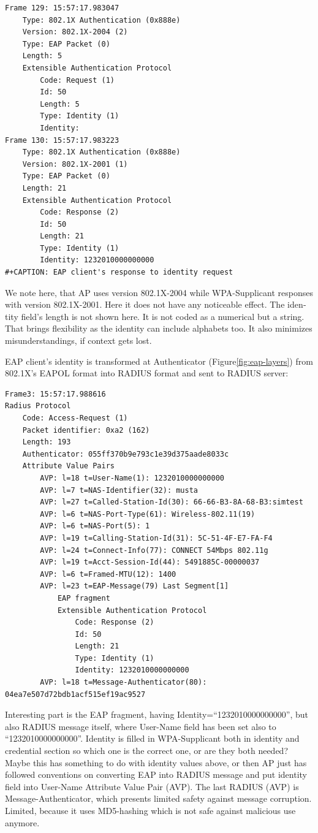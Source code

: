 \documentclass[12pt,a4paper,english]{tutthesis}
\begin{document}
\begin{otherlanguage}{english}
\begin{verbatim}
Frame 129: 15:57:17.983047
    Type: 802.1X Authentication (0x888e)
    Version: 802.1X-2004 (2)
    Type: EAP Packet (0)
    Length: 5
    Extensible Authentication Protocol
        Code: Request (1)
        Id: 50
        Length: 5
        Type: Identity (1)
        Identity: 
Frame 130: 15:57:17.983223
    Type: 802.1X Authentication (0x888e)
    Version: 802.1X-2001 (1)
    Type: EAP Packet (0)
    Length: 21
    Extensible Authentication Protocol
        Code: Response (2)
        Id: 50
        Length: 21
        Type: Identity (1)
        Identity: 1232010000000000
#+CAPTION: EAP client's response to identity request
\end{verbatim}
We note here, that AP uses version 802.1X-2004 while WPA-Supplicant responses with
version 802.1X-2001. Here it does not have any noticeable effect.
The identity field's length is not shown here.
It is not coded as a numerical but a string.
That brings flexibility as the identity can include alphabets too. It also minimizes misunderstandings,
if context gets lost.





EAP client's identity is transformed at Authenticator (Figure\ref{fig:eap-layers}) from 802.1X's 
EAPOL format  into RADIUS format and
sent to RADIUS server:
\begin{verbatim}
Frame3: 15:57:17.988616
Radius Protocol
    Code: Access-Request (1)
    Packet identifier: 0xa2 (162)
    Length: 193
    Authenticator: 055ff370b9e793c1e39d375aade8033c
    Attribute Value Pairs
        AVP: l=18 t=User-Name(1): 1232010000000000
        AVP: l=7 t=NAS-Identifier(32): musta
        AVP: l=27 t=Called-Station-Id(30): 66-66-B3-8A-68-B3:simtest
        AVP: l=6 t=NAS-Port-Type(61): Wireless-802.11(19)
        AVP: l=6 t=NAS-Port(5): 1
        AVP: l=19 t=Calling-Station-Id(31): 5C-51-4F-E7-FA-F4
        AVP: l=24 t=Connect-Info(77): CONNECT 54Mbps 802.11g
        AVP: l=19 t=Acct-Session-Id(44): 5491885C-00000037
        AVP: l=6 t=Framed-MTU(12): 1400
        AVP: l=23 t=EAP-Message(79) Last Segment[1]
            EAP fragment
            Extensible Authentication Protocol
                Code: Response (2)
                Id: 50
                Length: 21
                Type: Identity (1)
                Identity: 1232010000000000
        AVP: l=18 t=Message-Authenticator(80): 04ea7e507d72bdb1acf515ef19ac9527
\end{verbatim}
Interesting part is the EAP fragment, having
Identity=``1232010000000000'', but
also RADIUS message itself, where User-Name field has been set also 
to ``1232010000000000''. 
Identity is filled in WPA-Supplicant both in identity and credential
section so which one is the correct one, or are they both needed?
Maybe this has something to do with identity
values above, or then AP just has followed conventions on converting
EAP into RADIUS message and put identity field into User-Name Attribute Value Pair (AVP).
The last RADIUS (AVP) is 
Message-Authenticator, which presents limited safety against message 
corruption. Limited, because it uses MD5-hashing which is not safe
against malicious use anymore.


\end{otherlanguage}
\end{document}
